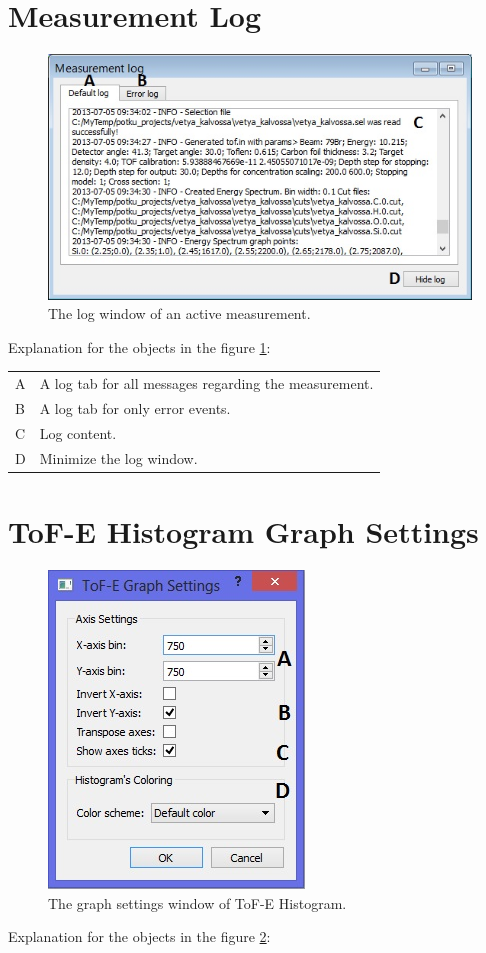 \documentclass{scrreprt}
\begin{document}
\section{Measurement Log}\label{measurementtab-log}
\begin{figure}[H]
\centering
\includegraphics[width=140mm]{measurement-log}
\caption{The log window of an active measurement.}
\label{fig-log}
\end{figure}
Explanation for the objects in the figure \ref{fig-log}:

\begin{tabular}{ll}
A & A log tab for all messages regarding the measurement.\\
B & A log tab for only error events.\\
C & Log content.\\
D & Minimize the log window.\\
\end{tabular}

\section{ToF-E Histogram Graph Settings}\label{measurement-tofe-settings}
\begin{figure}[H]
\centering
\includegraphics[scale=1]{measurement-tofe-settings}
\caption{The graph settings window of ToF-E Histogram.}
\label{fig-tofe-settings}
\end{figure}
Explanation for the objects in the figure \ref{fig-tofe-settings}:
\end{document}
